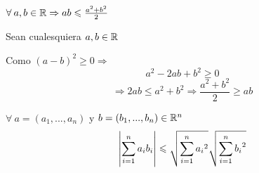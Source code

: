 \begin{aff}
            $\forall \: a,b \in \mathbb{R} \Rightarrow ab \leqslant \frac{a^2+b^2}{2}$
        \end{aff}
        \begin{explanation}
            Sean cualesquiera $a,b \in \mathbb{R}$  

            Como $(a-b)^2 \geqslant 0 \Rightarrow$
            \begin{equation*}
                a^2-2ab+b^2 \geqslant 0
            \end{equation*}
            \begin{equation*}
                \Rightarrow 2ab \leqslant a^2+b^2 \Rightarrow \frac{a^2+b^2}{2} \geqslant ab
            \end{equation*}
        \end{explanation}
        \begin{aff}\label{aff1}
            $\forall \: a=({a}_{1},...,{a}_{n})$ y $b=({b}_{1},...,{b}_{n}) \in \mathbb{R}^n$
            \begin{equation*}
                \abs{\sum_{i=1}^{n} {a}_{i}{b}_{i}}  \leqslant \sqrt{\sum_{i=1}^{n} {{a}_{i}}^{2}} \sqrt{\sum_{i=1}^{n} {{b}_{i}}^{2}}
            \end{equation*}
        \end{aff}
